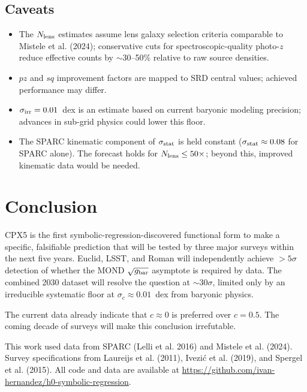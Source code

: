 \documentclass[twocolumn]{aastex631}
\begin{document}
\subsection{Caveats}

\begin{itemize}
\item The $N_{\rm lens}$ estimates assume lens galaxy selection criteria
      comparable to Mistele et al. (2024); conservative cuts for
      spectroscopic-quality photo-$z$ reduce effective counts by
      $\sim$30--50\% relative to raw source densities.
\item $pz$ and $sq$ improvement factors are mapped to SRD central values;
      achieved performance may differ.
\item $\sigma_{\rm irr} = 0.01$~dex is an estimate based on current
      baryonic modeling precision; advances in sub-grid physics could
      lower this floor.
\item The SPARC kinematic component of $\sigma_{\rm stat}$ is held constant
      ($\sigma_{\rm stat} \approx 0.08$ for SPARC alone).  The forecast
      holds for $N_{\rm lens} \le 50\times$; beyond this, improved
      kinematic data would be needed.
\end{itemize}

\section{Conclusion}

CPX5 is the first symbolic-regression-discovered functional form to make
a specific, falsifiable prediction that will be tested by three major
surveys within the next five years.  Euclid, LSST, and Roman will
independently achieve $>5\sigma$ detection of whether the MOND
$\sqrt{g_{\rm bar}}$ asymptote is required by data.  The combined 2030
dataset will resolve the question at $\sim$30$\sigma$, limited only by
an irreducible systematic floor at $\sigma_c \approx 0.01$~dex from
baryonic physics.

The current data already indicate that $c \approx 0$ is preferred over
$c = 0.5$.  The coming decade of surveys will make this conclusion
irrefutable.

\begin{acknowledgments}
This work used data from SPARC (Lelli et al. 2016) and Mistele et
al. (2024).  Survey specifications from Laureijs et al. (2011),
Ivezi\'c et al. (2019), and Spergel et al. (2015).  All code and
data are available at
\url{https://github.com/ivan-hernandez/h0-symbolic-regression}.
\end{acknowledgments}
\end{document}
